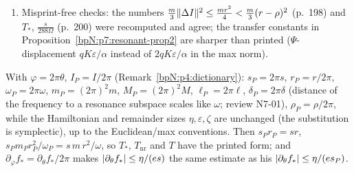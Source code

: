 \begin{remark}
\begin{enumerate}[label=(\arabic*)]
\item Misprint-free checks: the numbers $\frac m3\lVert \Delta I\rVert^2\le\frac{mr^2}4<\frac m3(r-\rho)^2$ (p.~198) and $T_*$, $\frac s{288\Omega}$ (p.~200) were recomputed and agree; the transfer constants in Proposition~\ref{bpN:p7:resonant-prop2} are sharper than printed ($\Psi$-displacement $qK\varepsilon/\alpha$ instead of $2qK\varepsilon/\alpha$ in the max norm).
\end{enumerate}
\end{remark}

\begin{remark}\label{bpN:p7:dictionary}
With $\varphi=2\pi\theta$, $I_P=I/2\pi$ (Remark~\ref{bpN:p4:dictionary}): $s_P=2\pi s$, $r_P=r/2\pi$, $\omega_P=2\pi\omega$, $m_P=(2\pi)^2m$, $M_P=(2\pi)^2M$, $\ell_P=2\pi\ell$, $\delta_P=2\pi\delta$ (distance of the frequency to a resonance subspace scales like $\omega$; review N7-01), $\rho_P=\rho/2\pi$, while the Hamiltonian and remainder sizes $\eta,\varepsilon,\zeta$ are unchanged (the substitution is symplectic), up to the Euclidean/max conventions. Then $s_Pr_P=sr$, $s_Pm_Pr_P^2/\omega_P=s\,m\,r^2/\omega$, so $T_*$, $T_{\mathrm{nr}}$ and $T$ have the printed form; and $\partial_\varphi f_*=\partial_\theta f_*/2\pi$ makes $\lvert \partial_\theta f_*\rvert\le\eta/(es)$ the same estimate as his $\lvert \partial_\theta f_*\rvert\le\eta/(es_P)$.
\end{remark}

